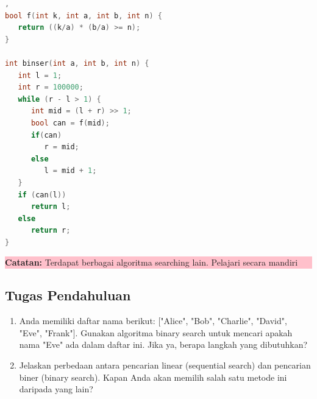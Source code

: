 \begin{lstlisting}[language=c,caption=Implementasi Binary Search],   
bool f(int k, int a, int b, int n) {
   return ((k/a) * (b/a) >= n);
}

int binser(int a, int b, int n) {
   int l = 1;
   int r = 100000;
   while (r - l > 1) {
      int mid = (l + r) >> 1;
      bool can = f(mid);
      if(can)
         r = mid;
      else
         l = mid + 1;
   }
   if (can(l))
      return l;
   else
      return r;
}
\end{lstlisting}

\begin{center}
	\colorbox{pink}{\parbox{0.8\linewidth}{\textbf{Catatan:} Terdapat berbagai algoritma searching lain. Pelajari secara mandiri}}
\end{center}

\subsection{Tugas Pendahuluan}
\begin{enumerate}
    \item Anda memiliki daftar nama berikut: ["Alice", "Bob", "Charlie", "David", "Eve", "Frank"]. 
    Gunakan algoritma binary search untuk mencari apakah nama "Eve" ada dalam daftar ini. 
    Jika ya, berapa langkah yang dibutuhkan?
    \item Jelaskan perbedaan antara pencarian linear (sequential search) dan pencarian biner (binary search).
     Kapan Anda akan memilih salah satu metode ini daripada yang lain?
\end{enumerate}
